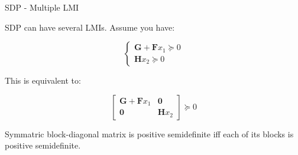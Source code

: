 \documentclass{beamer}
\begin{document}
\begin{frame}{SDP - Multiple LMI}
\begin{flushleft}

SDP can have several LMIs. Assume you have:

\begin{equation}
    \begin{cases}
        \mathbf{G} +  \mathbf{F} x_1 \succeq 0 \\
        \mathbf{H} x_2 \succeq 0
    \end{cases}
\end{equation}


This is equivalent to:

\begin{equation}
    \begin{bmatrix} 
           \mathbf{G} +  \mathbf{F} x_1 & \mathbf{0} \\
            \mathbf{0} & \mathbf{H} x_2 
    \end{bmatrix} 
    \succeq 0
\end{equation}

Symmatric block-diagonal matrix is positive semidefinite iff each of its blocks is positive semidefinite.

\end{flushleft}
\end{frame}
\end{document}
